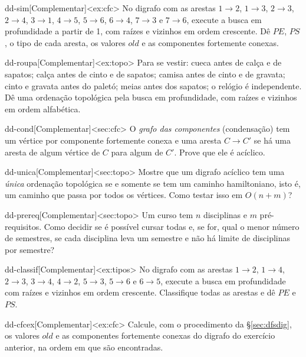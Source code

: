 \excompl
\begin{exercicio}{dd-sim}[Complementar]<ex:cfc>
No digrafo com as arestas $1\to2$, $1\to3$, $2\to3$, $2\to4$, $3\to1$, $4\to5$, $5\to6$, $6\to4$, $7\to3$ e $7\to6$, execute a busca em profundidade a partir de 1, com raízes e vizinhos em ordem crescente. Dê $PE$, $PS$, o tipo de cada aresta, os valores $old$ e as componentes fortemente conexas.
\end{exercicio}
\begin{exercicio}{dd-roupa}[Complementar]<ex:topo>
Para se vestir: cueca antes de calça e de sapatos; calça antes de cinto e de sapatos; camisa antes de cinto e de gravata; cinto e gravata antes do paletó; meias antes dos sapatos; o relógio é independente. Dê uma ordenação topológica pela busca em profundidade, com raízes e vizinhos em ordem alfabética.
\end{exercicio}
\begin{exercicio}{dd-cond}[Complementar]<sec:cfc>
O \emph{grafo das componentes} (condensação) tem um vértice por componente fortemente conexa e uma aresta $C\to C'$ se há uma aresta de algum vértice de $C$ para algum de $C'$. Prove que ele é acíclico.
\end{exercicio}
\begin{exercicio}{dd-unica}[Complementar]<sec:topo>
Mostre que um digrafo acíclico tem uma \emph{única} ordenação topológica se e somente se tem um caminho hamiltoniano, isto é, um caminho que passa por todos os vértices. Como testar isso em $O(n+m)$?
\end{exercicio}
\begin{exercicio}{dd-prereq}[Complementar]<sec:topo>
Um curso tem $n$ disciplinas e $m$ pré-requisitos. Como decidir se é possível cursar todas e, se for, qual o menor número de semestres, se cada disciplina leva um semestre e não há limite de disciplinas por semestre?
\end{exercicio}
\begin{exercicio}{dd-classif}[Complementar]<ex:tipos>
No digrafo com as arestas $1\to2$, $1\to4$, $2\to3$, $3\to4$, $4\to2$, $5\to3$, $5\to6$ e $6\to5$, execute a busca em profundidade com raízes e vizinhos em ordem crescente. Classifique todas as arestas e dê $PE$ e $PS$.
\end{exercicio}
\begin{exercicio}{dd-cfcex}[Complementar]<ex:cfc>
Calcule, com o procedimento da §\ref{sec:dfsdig}, os valores $old$ e as componentes fortemente conexas do digrafo do exercício anterior, na ordem em que são encontradas.
\end{exercicio}
